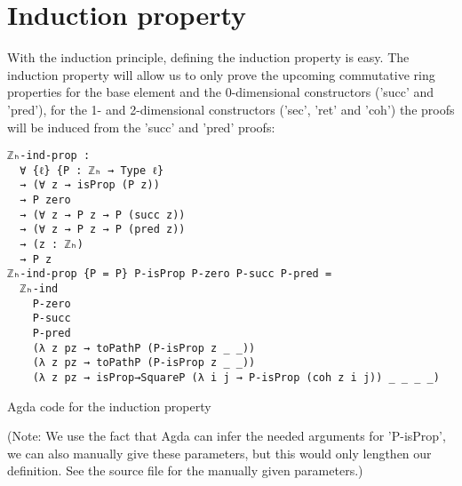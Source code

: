 \section{Induction property}

With the induction principle, defining the induction property is easy. The induction property will allow us to only prove the upcoming commutative ring properties for the base element and the 0-dimensional constructors ('succ' and 'pred'), for the 1- and 2-dimensional constructors ('sec', 'ret' and 'coh') the proofs will be induced from the 'succ' and 'pred' proofs:
\begin{listing}[H]
\begin{verbatim}
ℤₕ-ind-prop :
  ∀ {ℓ} {P : ℤₕ → Type ℓ}
  → (∀ z → isProp (P z))
  → P zero
  → (∀ z → P z → P (succ z))
  → (∀ z → P z → P (pred z))
  → (z : ℤₕ)
  → P z
ℤₕ-ind-prop {P = P} P-isProp P-zero P-succ P-pred =
  ℤₕ-ind
    P-zero
    P-succ
    P-pred
    (λ z pz → toPathP (P-isProp z _ _))
    (λ z pz → toPathP (P-isProp z _ _))
    (λ z pz → isProp→SquareP (λ i j → P-isProp (coh z i j)) _ _ _ _)
\end{verbatim}
\caption{Agda code for the induction property}
\end{listing}
(Note: We use the fact that Agda can infer the needed arguments for 'P-isProp', we can also manually give these parameters, but this would only lengthen our definition. See the source file for the manually given parameters.)
